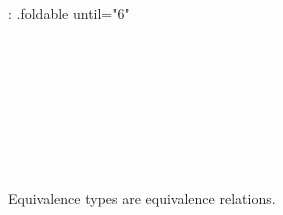 {: .foldable until="6" }
\begin{code}%
%
\>[2]\<%
\\
%
\>[2]\<%
\\
\>[2][@{}l@{\AgdaIndent{0}}]%
\>[4]\AgdaSymbol{:}\AgdaSpace{}%
\AgdaSpace{}%
\AgdaSymbol{\{}\AgdaSpace{}%
\AgdaSymbol{\}}\AgdaSpace{}%
\AgdaSymbol{\{}\AgdaSpace{}%
\AgdaSymbol{:}\AgdaSpace{}%
\AgdaSpace{}%
\AgdaSymbol{\}\{}\AgdaSpace{}%
\AgdaSymbol{:}\AgdaSpace{}%
\AgdaSpace{}%
\AgdaSymbol{\}}\<%
\\
%
\>[4]\AgdaSpace{}%
\AgdaSpace{}%
\AgdaSymbol{(}\AgdaSpace{}%
\AgdaSpace{}%
\AgdaSymbol{)}\AgdaSpace{}%
\<%
\\
%
\>[4]\AgdaComment{----------------}\<%
\\
%
\>[4]\AgdaSpace{}%
\AgdaSpace{}%
\AgdaSymbol{(}\AgdaSpace{}%
\AgdaSpace{}%
\AgdaSymbol{)}\AgdaSpace{}%
\<%
\\
%
\\[\AgdaEmptyExtraSkip]%
%
\>[2]\AgdaSpace{}%
\AgdaSymbol{(}\AgdaSpace{}%
\AgdaOperator{\AgdaInductiveConstructor{,}}\AgdaSpace{}%
\AgdaSymbol{(}\AgdaSpace{}%
\AgdaOperator{\AgdaInductiveConstructor{,}}\AgdaSpace{}%
\AgdaSymbol{(}\AgdaSpace{}%
\AgdaOperator{\AgdaInductiveConstructor{,}}\AgdaSpace{}%
\AgdaSymbol{)))}\AgdaSpace{}%
\AgdaSymbol{=}\AgdaSpace{}%
\AgdaSpace{}%
\AgdaOperator{\AgdaInductiveConstructor{,}}\AgdaSpace{}%
\AgdaSymbol{(}\AgdaSpace{}%
\AgdaOperator{\AgdaInductiveConstructor{,}}\AgdaSpace{}%
\AgdaSymbol{(}\AgdaSpace{}%
\AgdaOperator{\AgdaInductiveConstructor{,}}\AgdaSpace{}%
\AgdaSymbol{))}\<%
\end{code}

Equivalence types are equivalence relations.

